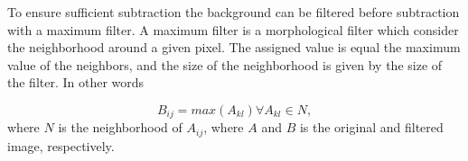 To ensure sufficient subtraction the background can be filtered before subtraction with a maximum filter. A maximum filter is a morphological filter which consider the neighborhood around a given pixel. The assigned value is equal the maximum value of the neighbors, and the size of the neighborhood is given by the size of the filter. In other words

\begin{equation}
B_{ij} = max(A_{kl}) \forall A_{kl} \in N,
\end{equation}
where $N$ is the neighborhood of $A_{ij}$, where $A$ and $B$ is the original and filtered image, respectively. 


%
%
%










